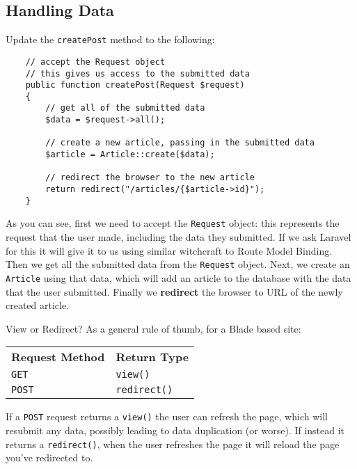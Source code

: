 \subsection{Handling Data}

Update the \texttt{createPost} method to the following:

\begin{verbatim}
    // accept the Request object
    // this gives us access to the submitted data
    public function createPost(Request $request)
    {
        // get all of the submitted data
        $data = $request->all();

        // create a new article, passing in the submitted data
        $article = Article::create($data);

        // redirect the browser to the new article
        return redirect("/articles/{$article->id}");
    }
\end{verbatim}

As you can see, first we need to accept the \texttt{Request} object: this represents the request that the user made, including the data they submitted. If we ask Laravel for this it will give it to us using similar witchcraft to Route Model Binding.
\\

Then we get all the submitted data from the \texttt{Request} object. Next, we create an \texttt{Article} using that data, which will add an article to the database with the data that the user submitted. Finally we \textbf{redirect} the browser to URL of the newly created article.

\begin{infobox}{View or Redirect?}
    As a general rule of thumb, for a Blade based site:
    \\

    \begin{tabu}{l X}
        \textbf{Request Method}  & \textbf{Return Type} \\
        \texttt{GET}             & \texttt{view()} \\
        \texttt{POST}            & \texttt{redirect()} \\
    \end{tabu}

    \par\bigskip

    If a \texttt{POST} request returns a \texttt{view()} the user can refresh the page, which will resubmit any data, possibly leading to data duplication (or worse). If instead it returns a \texttt{redirect()}, when the user refreshes the page it will reload the page you've redirected to.
\end{infobox}

